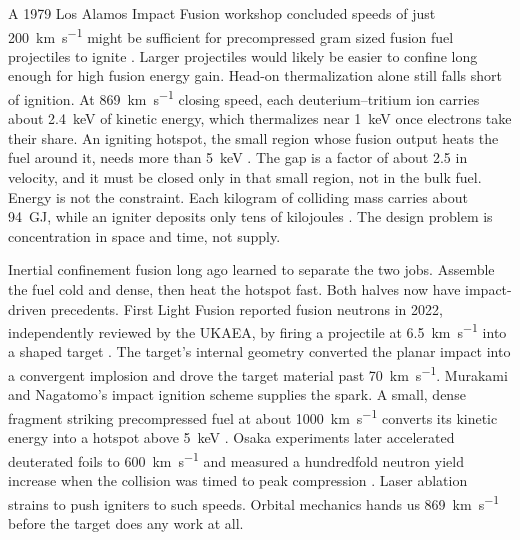 \documentclass{article}
\begin{document}
A 1979 Los Alamos Impact Fusion workshop concluded speeds of just \SI{200}{\kilo\meter\per\second} might be sufficient for precompressed gram sized fusion fuel projectiles to ignite \cite{impactfusion1979}.   Larger projectiles would likely be easier to confine long enough for high fusion energy gain.  Head-on thermalization alone still falls short of ignition. At \SI{869}{\kilo\meter\per\second} closing speed, each deuterium--tritium ion carries about \SI{2.4}{\kilo\electronvolt} of kinetic energy, which thermalizes near \SI{1}{\kilo\electronvolt} once electrons take their share. An igniting hotspot, the small region whose fusion output heats the fuel around it, needs more than \SI{5}{\kilo\electronvolt} \cite{murakami2005impact}. The gap is a factor of about 2.5 in velocity, and it must be closed only in that small region, not in the bulk fuel. Energy is not the constraint. Each kilogram of colliding mass carries about \SI{94}{\giga\joule}, while an igniter deposits only tens of kilojoules \cite{murakami2005impact}. The design problem is concentration in space and time, not supply.

Inertial confinement fusion long ago learned to separate the two jobs. Assemble the fuel cold and dense, then heat the hotspot fast. Both halves now have impact-driven precedents. First Light Fusion reported fusion neutrons in 2022, independently reviewed by the UKAEA, by firing a projectile at \SI{6.5}{\kilo\meter\per\second} into a shaped target \cite{firstlight2022fusion}. The target's internal geometry converted the planar impact into a convergent implosion and drove the target material past \SI{70}{\kilo\meter\per\second}. Murakami and Nagatomo's impact ignition scheme supplies the spark. A small, dense fragment striking precompressed fuel at about \SI{1000}{\kilo\meter\per\second} converts its kinetic energy into a hotspot above \SI{5}{\kilo\electronvolt} \cite{murakami2005impact}. Osaka experiments later accelerated deuterated foils to \SI{600}{\kilo\meter\per\second} and measured a hundredfold neutron yield increase when the collision was timed to peak compression \cite{azechi2009impact}. Laser ablation strains to push igniters to such speeds. Orbital mechanics hands us \SI{869}{\kilo\meter\per\second} before the target does any work at all.
\end{document}
